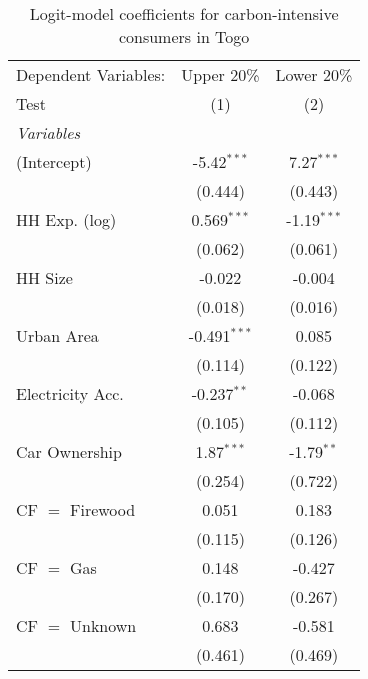 
\begin{table}[htbp!]
   \centering
   \small
   \begin{adjustbox}{width = 1\textwidth, max height = 0.95\textheight, center}
      \begin{threeparttable}[b]
         \caption{\label{tab:Logit_1_TGO} Logit-model coefficients for carbon-intensive consumers in Togo}
         \begin{tabular}{lcc}
            \tabularnewline \midrule \midrule
            Dependent Variables: & Upper 20\%     & Lower 20\%\\   
            Test                 & (1)            & (2)\\  
            \midrule
            \emph{Variables}\\
            (Intercept)          & -5.42$^{***}$  & 7.27$^{***}$\\   
                                 & (0.444)        & (0.443)\\   
            HH Exp. (log)        & 0.569$^{***}$  & -1.19$^{***}$\\   
                                 & (0.062)        & (0.061)\\   
            HH Size              & -0.022         & -0.004\\   
                                 & (0.018)        & (0.016)\\   
            Urban Area           & -0.491$^{***}$ & 0.085\\   
                                 & (0.114)        & (0.122)\\   
            Electricity Acc.     & -0.237$^{**}$  & -0.068\\   
                                 & (0.105)        & (0.112)\\   
            Car Ownership        & 1.87$^{***}$   & -1.79$^{**}$\\   
                                 & (0.254)        & (0.722)\\   
            CF $=$ Firewood      & 0.051          & 0.183\\   
                                 & (0.115)        & (0.126)\\   
            CF $=$ Gas           & 0.148          & -0.427\\   
                                 & (0.170)        & (0.267)\\   
            CF $=$ Unknown       & 0.683          & -0.581\\   
                                 & (0.461)        & (0.469)\\   

\end{tabular}
\end{threeparttable}
\end{adjustbox}
\end{table}
